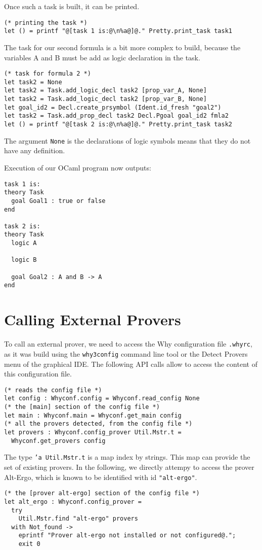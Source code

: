 Once such a task is built, it can be printed.
\begin{verbatim}
(* printing the task *)
let () = printf "@[task 1 is:@\n%a@]@." Pretty.print_task task1
\end{verbatim}

The task for our second formula is a bit more complex to build, because the variables A and B must be add as logic declaration in the task.
\begin{verbatim}
(* task for formula 2 *)
let task2 = None
let task2 = Task.add_logic_decl task2 [prop_var_A, None] 
let task2 = Task.add_logic_decl task2 [prop_var_B, None] 
let goal_id2 = Decl.create_prsymbol (Ident.id_fresh "goal2") 
let task2 = Task.add_prop_decl task2 Decl.Pgoal goal_id2 fmla2
let () = printf "@[task 2 is:@\n%a@]@." Pretty.print_task task2
\end{verbatim}
The argument \texttt{None} is the declarations of logic symbols means
that they do not have any definition.

Execution of our OCaml program now outputs:
\begin{verbatim}
task 1 is:
theory Task
  goal Goal1 : true or false
end

task 2 is:
theory Task
  logic A
  
  logic B
  
  goal Goal2 : A and B -> A
end
\end{verbatim}

\section{Calling External Provers}

To call an external prover, we need to access the Why configuration
file \texttt{.whyrc}, as it was build using the \texttt{why3config}
command line tool or the \textsf{Detect Provers} menu of the graphical
IDE. The following API calls allow to access the content of this
configuration file.
\begin{verbatim}
(* reads the config file *)
let config : Whyconf.config = Whyconf.read_config None
(* the [main] section of the config file *)
let main : Whyconf.main = Whyconf.get_main config
(* all the provers detected, from the config file *)
let provers : Whyconf.config_prover Util.Mstr.t = 
  Whyconf.get_provers config
\end{verbatim}
The type \texttt{'a Util.Mstr.t} is a map index by strings. This map
can provide the set of existing provers. In the following, we directly
attempy to access the prover Alt-Ergo, which is known to be identified with id
\texttt{"alt-ergo"}. 
\begin{verbatim}
(* the [prover alt-ergo] section of the config file *)
let alt_ergo : Whyconf.config_prover = 
  try
    Util.Mstr.find "alt-ergo" provers 
  with Not_found ->
    eprintf "Prover alt-ergo not installed or not configured@.";
    exit 0
\end{verbatim}

